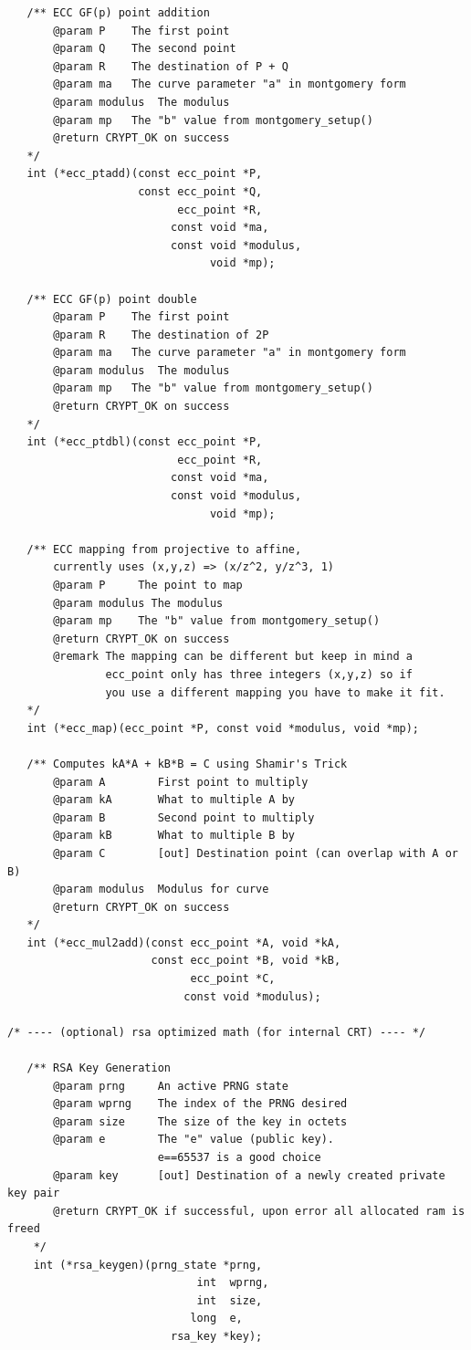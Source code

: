 \documentclass[synpaper]{book}
\begin{document}
\begin{small}
\begin{verbatim}
   /** ECC GF(p) point addition
       @param P    The first point
       @param Q    The second point
       @param R    The destination of P + Q
       @param ma   The curve parameter "a" in montgomery form
       @param modulus  The modulus
       @param mp   The "b" value from montgomery_setup()
       @return CRYPT_OK on success
   */
   int (*ecc_ptadd)(const ecc_point *P,
                    const ecc_point *Q,
                          ecc_point *R,
                         const void *ma,
                         const void *modulus,
                               void *mp);

   /** ECC GF(p) point double
       @param P    The first point
       @param R    The destination of 2P
       @param ma   The curve parameter "a" in montgomery form
       @param modulus  The modulus
       @param mp   The "b" value from montgomery_setup()
       @return CRYPT_OK on success
   */
   int (*ecc_ptdbl)(const ecc_point *P,
                          ecc_point *R,
                         const void *ma,
                         const void *modulus,
                               void *mp);

   /** ECC mapping from projective to affine,
       currently uses (x,y,z) => (x/z^2, y/z^3, 1)
       @param P     The point to map
       @param modulus The modulus
       @param mp    The "b" value from montgomery_setup()
       @return CRYPT_OK on success
       @remark The mapping can be different but keep in mind a
               ecc_point only has three integers (x,y,z) so if
               you use a different mapping you have to make it fit.
   */
   int (*ecc_map)(ecc_point *P, const void *modulus, void *mp);

   /** Computes kA*A + kB*B = C using Shamir's Trick
       @param A        First point to multiply
       @param kA       What to multiple A by
       @param B        Second point to multiply
       @param kB       What to multiple B by
       @param C        [out] Destination point (can overlap with A or B)
       @param modulus  Modulus for curve
       @return CRYPT_OK on success
   */
   int (*ecc_mul2add)(const ecc_point *A, void *kA,
                      const ecc_point *B, void *kB,
                            ecc_point *C,
                           const void *modulus);

/* ---- (optional) rsa optimized math (for internal CRT) ---- */

   /** RSA Key Generation
       @param prng     An active PRNG state
       @param wprng    The index of the PRNG desired
       @param size     The size of the key in octets
       @param e        The "e" value (public key).
                       e==65537 is a good choice
       @param key      [out] Destination of a newly created private key pair
       @return CRYPT_OK if successful, upon error all allocated ram is freed
    */
    int (*rsa_keygen)(prng_state *prng,
                             int  wprng,
                             int  size,
                            long  e,
                         rsa_key *key);


\end{verbatim}
\end{small}
\end{document}
